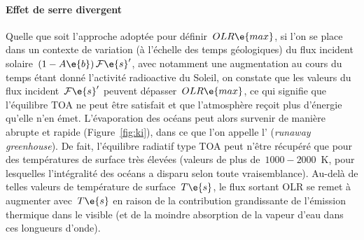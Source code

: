 
\sk
\paragraph{Effet de serre divergent} 
Quelle que soit l'approche adoptée pour définir~$OLR\e{max}$,
si l'on se place dans un contexte de variation
(à l'échelle des temps géologiques) du flux incident
solaire~$(1-A\e{b}) \, \mathcal{F}\e{s}'$,
avec notamment une augmentation au cours du temps
étant donné l'activité radioactive du Soleil,
on constate que les valeurs du flux 
incident~$\mathcal{F}\e{s}'$ peuvent
dépasser~$OLR\e{max}$, ce qui signifie que
l'équilibre TOA ne peut être satisfait et que
l'atmosphère reçoit plus d'énergie qu'elle
n'en émet. L'évaporation des océans peut alors
survenir de manière abrupte et rapide (Figure~\ref{fig:ki}),
dans ce que l'on appelle l'
(\emph{runaway greenhouse}). De fait, 
l'équilibre radiatif type TOA peut n'être
récupéré que pour des températures de surface 
très élevées (valeurs de plus de~$1000-2000$~K,
pour lesquelles l'intégralité des océans a disparu
selon toute vraisemblance).
Au-delà de telles valeurs de température de surface~$T\e{s}$,
le flux sortant OLR se remet à augmenter avec~$T\e{s}$
en raison de la contribution grandissante de l'émission
thermique dans le visible (et de la moindre absorption
de la vapeur d'eau dans ces longueurs d'onde).





